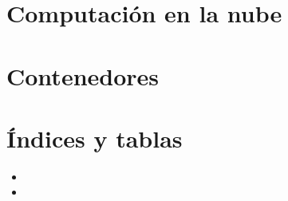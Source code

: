 \documentclass[a4paper,11pt,spanish]{sphinxmanual}
\begin{document}
\part{Computación en la nube}
\label{\detokenize{computacion-en-la-nube::doc}}\label{\detokenize{computacion-en-la-nube:computacion-en-la-nube}}

\part{Contenedores}
\label{\detokenize{contenedores:contenedores}}\label{\detokenize{contenedores::doc}}

\part{Índices y tablas}
\label{\detokenize{index:indices-y-tablas}}\begin{itemize}
\item {} 

\item {} 

\end{itemize}



\renewcommand{\indexname}{Índice}
\printindex
\end{document}
